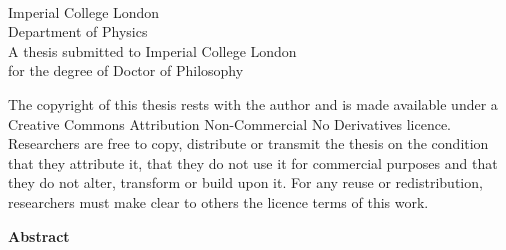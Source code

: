 \begin{titlepage}
\begin{center}

\begin{centering}
\Large \@author \\
\vspace{0.5cm}
\Large Imperial College London \\
\Large Department of Physics \\
\vspace{8cm}
\small A thesis submitted to Imperial College London \\
\small for the degree of Doctor of Philosophy
\end{centering}

\end{center}

\newpage

\thispagestyle{empty}
\mbox{}

\newpage

\vspace*{\fill}
The copyright of this thesis rests with the author and is made available under a Creative Commons Attribution Non-Commercial No Derivatives licence. 
Researchers are free to copy, distribute or transmit the thesis on the condition that they attribute it, that they do not use it for commercial purposes and that they do not alter, transform or build upon it. 
For any reuse or redistribution, researchers must make clear to others the licence terms of this work.
\vspace*{\fill}

\newpage

\vspace*{\fill}
\begin{adjustwidth}{1cm}{1cm}
\begin{center}
\Large \textbf{Abstract}
\vspace{0.5cm}
\end{center}


\end{adjustwidth}
\end{titlepage}
